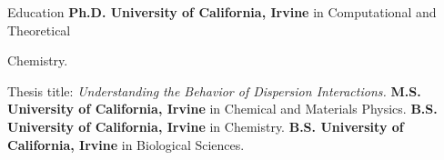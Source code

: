 \begin{rubric}{Education}
  \textbf{Ph.D. University of California, Irvine} in Computational and Theoretical

  Chemistry.
  \par Thesis title: \emph{Understanding the Behavior of Dispersion Interactions.}
%
  \textbf{M.S. University of California, Irvine} in Chemical and Materials Physics.
%
  \textbf{B.S. University of California, Irvine} in Chemistry.
%
  \textbf{B.S. University of California, Irvine} in Biological Sciences.
\end{rubric}
